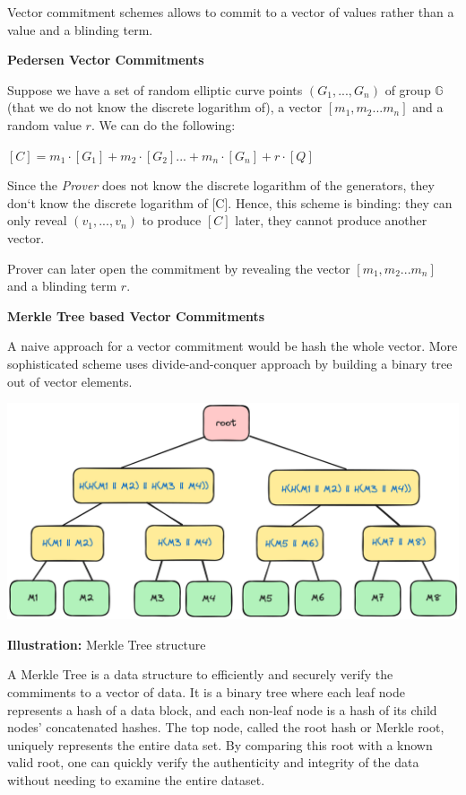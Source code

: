 \documentclass[../lecture-notes.tex]{subfiles}
\begin{document}
Vector commitment schemes allows to commit to a vector of values rather than a value and a blinding term.

\vspace{0.5 cm}

\textbf{Pedersen Vector Commitments}

Suppose we have a set of random elliptic curve points $(G_1,...,G_n)$ of group $\mathbb{G}$ 
(that we do not know the discrete logarithm of), a vector $[m_1, m_2 ... m_n]$ and a random value $r$. We can do the following:

\begin{center}
    $ [C] = m_1\cdot[G_1] + m_2 \cdot [G_2] ... + m_n \cdot [G_n] + r \cdot [Q]$ 
\end{center}

Since the \textit{Prover} does not know the discrete logarithm of the generators, they don`t know the discrete logarithm of [C]. Hence, this scheme is binding: they can only reveal $(v_1,...,v_n)$ to produce $[C]$ later, they cannot produce another vector.

Prover can later open the commitment by revealing the vector $[m_1, m_2 ... m_n]$ and a blinding term $r$.

\vspace{0.5 cm}

\textbf{Merkle Tree based Vector Commitments}

A naive approach for a vector commitment would be hash the whole vector. More sophisticated scheme uses divide-and-conquer approach by building a binary tree out of vector elements.

\begin{center}
    \centering\includegraphics[width=0.9\linewidth, clip]{images/lecture_5/MerkleTree.png}

    \scriptsize{\textbf{Illustration:} Merkle Tree structure}
\end{center}

A Merkle Tree is a data structure to efficiently and securely verify the commiments to a vector of data. It is a binary tree where each leaf node represents a hash of a data block, and each non-leaf node is a hash of its child nodes' concatenated hashes. The top node, called the root hash or Merkle root, uniquely represents the entire data set. By comparing this root with a known valid root, one can quickly verify the authenticity and integrity of the data without needing to examine the entire dataset. 
\end{document}
